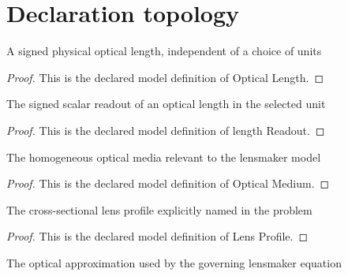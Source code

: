 \section{Declaration topology}
\begin{definition}
  \label{def:physics:phyx-mini-0067:phyxminiproblems-problemphyxmini0067-opticallength}
  A signed physical optical length, independent of a choice of units
\end{definition}
\begin{proof}
  This is the declared model definition of Optical Length.
\end{proof}
\begin{definition}
  \label{def:physics:phyx-mini-0067:phyxminiproblems-problemphyxmini0067-lengthreadout}
  The signed scalar readout of an optical length in the selected unit
\end{definition}
\begin{proof}
  This is the declared model definition of length Readout.
\end{proof}
\begin{definition}
  \label{def:physics:phyx-mini-0067:phyxminiproblems-problemphyxmini0067-opticalmedium}
  The homogeneous optical media relevant to the lensmaker model
\end{definition}
\begin{proof}
  This is the declared model definition of Optical Medium.
\end{proof}
\begin{definition}
  \label{def:physics:phyx-mini-0067:phyxminiproblems-problemphyxmini0067-lensprofile}
  The cross-sectional lens profile explicitly named in the problem
\end{definition}
\begin{proof}
  This is the declared model definition of Lens Profile.
\end{proof}
\begin{definition}
  \label{def:physics:phyx-mini-0067:phyxminiproblems-problemphyxmini0067-opticalapproximation}
  The optical approximation used by the governing lensmaker equation
\end{definition}
